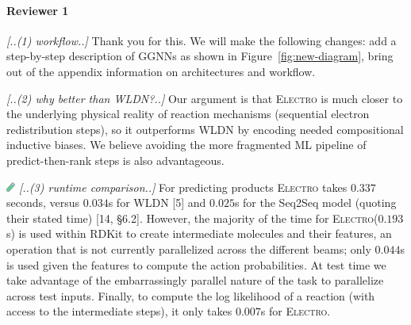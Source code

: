 \documentclass{article}
\newcommand{\ourModel}{\textsc{Electro}\xspace}
\begin{document}
\vspace{-5pt}
\paragraph{Reviewer 1}

\emph{[..(1) workflow..]} 
Thank you for this. We will make the following changes: add a step-by-step description of GGNNs as shown in Figure~\ref{fig:new-diagram}, bring out of the appendix information on architectures and workflow. 

\emph{[..(2) why better than WLDN?..]}
Our argument is that \ourModel is much closer to the underlying physical reality of reaction mechanisms (sequential electron redistribution steps), so it outperforms WLDN by encoding needed compositional inductive biases. 
We believe avoiding the more fragmented ML pipeline of predict-then-rank steps is also advantageous.  %


\includegraphics[width=0.3cm]{testtube.png} \emph{[..(3) runtime comparison..]}
For predicting products %
\ourModel takes $0.337$ seconds, versus $0.034$s for WLDN [5] and $0.025$s %
for the Seq2Seq model (quoting their stated time) [14, \S6.2]. 
 However, the majority of the time for \ourModel ($0.193$s) is used within RDKit to create intermediate molecules and their features, an operation that is not currently parallelized across the different beams; only $0.044$s is used given the features to compute the action probabilities.
  At test time we take advantage of the embarrassingly parallel nature of the task to parallelize across test inputs. 
   Finally, to compute the log likelihood of a reaction (with access to the intermediate steps), it only takes $0.007$s for \ourModel. %
\end{document}

